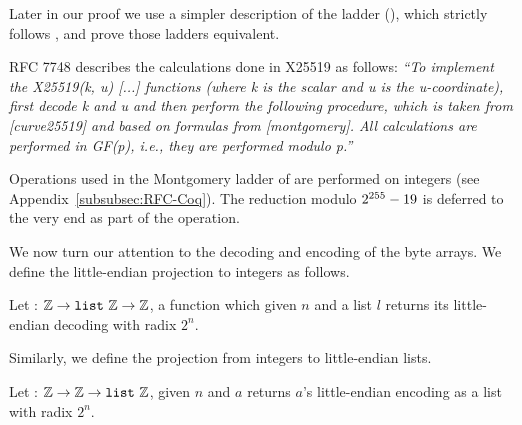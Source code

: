 Later in our proof we use a simpler description of the ladder
(), which strictly follows ,
and prove those ladders equivalent.

RFC 7748 describes the calculations done in X25519 as follows:
\emph{``To implement the X25519(k, u) [...] functions (where k is
  the scalar and u is the u-coordinate), first decode k and u and then
  perform the following procedure, which is taken from [curve25519] and
  based on formulas from [montgomery].  All calculations are performed
  in GF(p), i.e., they are performed modulo p.''}~\cite{rfc7748}

Operations used in the Montgomery ladder of  are performed on
integers (see Appendix~\ref{subsubsec:RFC-Coq}).
The reduction modulo $2^{255}-19$ is deferred to the very end as part of the
 operation.

We now turn our attention to the decoding and encoding of the byte arrays.
We define the little-endian projection to integers as follows.
\begin{dfn}
  Let  : $\mathbb{Z} \rightarrow \texttt{list}~\mathbb{Z} \rightarrow \mathbb{Z}$,
  a function which given $n$ and a list $l$ returns its little-endian decoding with radix $2^n$.
\end{dfn}
Similarly, we define the projection from integers to little-endian lists.
\begin{dfn}
  Let  : $\mathbb{Z} \rightarrow \mathbb{Z} \rightarrow \texttt{list}~\mathbb{Z}$, given
  $n$ and $a$ returns $a$'s little-endian encoding as a list with radix $2^n$.
\end{dfn}


